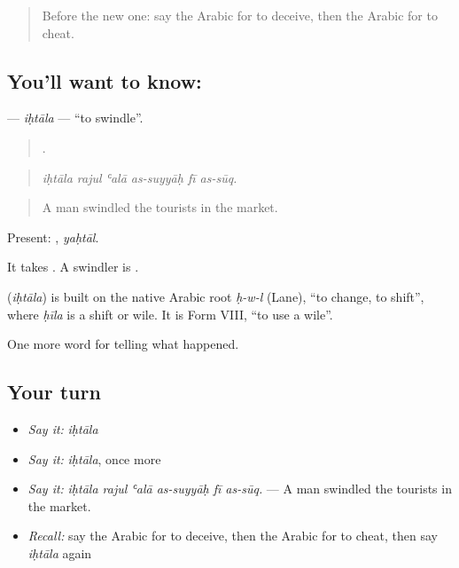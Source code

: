 \label{lesson:AR-C351-ihtala}



\begin{quote}
Before the new one: say the Arabic for to deceive, then the Arabic for to cheat.
\end{quote}

\subsection*{You'll want to know: }
\textbf{} — \emph{iḥtāla} — \textquotedblleft{}to swindle\textquotedblright{}.

\begin{quote}
     .
\end{quote}

\begin{quote}
\emph{iḥtāla rajul ʿalā as-suyyāḥ fī as-sūq.}
\end{quote}

\begin{quote}
A man swindled the tourists in the market.
\end{quote}

Present: , \emph{yaḥtāl}.

It takes . A swindler is .

\begin{cousinweb}
\textbf{} (\emph{iḥtāla}) is built on the native Arabic root \emph{ḥ-w-l} (Lane), \textquotedblleft{}to change, to shift\textquotedblright{}, where \emph{ḥīla} is a shift or wile. It is Form VIII, \textquotedblleft{}to use a wile\textquotedblright{}.
\end{cousinweb}

\begin{grammarlens}[title={What you've built}]
One more word for telling what happened.
\end{grammarlens}

\subsection*{Your turn}
\begin{itemize}
\raggedright
  \item \emph{Say it:} \emph{iḥtāla}
  \item \emph{Say it:} \emph{iḥtāla}, once more
  \item \emph{Say it:} \emph{iḥtāla rajul ʿalā as-suyyāḥ fī as-sūq.} — A man swindled the tourists in the market.
  \item \emph{Recall:} say the Arabic for to deceive, then the Arabic for to cheat, then say \emph{iḥtāla} again
\end{itemize}


